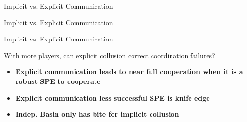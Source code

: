 \documentclass[english]{beamer}
\begin{document}
\begin{frame}{Implicit vs. Explicit Communication}
\begin{center}\end{center}
\end{frame}
\begin{frame}{Implicit vs. Explicit Communication}
\begin{center}\end{center}
\end{frame}
\begin{frame}{Implicit vs. Explicit Communication}
\begin{center}\end{center}
\end{frame}


\begin{frame}
\begin{card}[Question 3]
 With more players, can explicit collusion correct coordination failures?
        \begin{itemize}
            \item \textbf{Explicit communication leads to near full cooperation when it is a robust SPE to cooperate}
            \item \textbf{Explicit communication less successful SPE is knife edge }
            \item \textbf{Indep. Basin only has bite for implicit collusion}
        \end{itemize}
    \end{card}
\end{frame}
\end{document}
